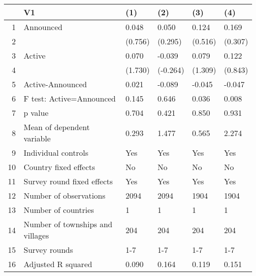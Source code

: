 \begin{table}[ht]
\centering
\begin{tabular}{rlllll}
  \hline
 & V1 & (1) & (2) & (3) & (4) \\ 
  \hline
1 & Announced & 0.048 & 0.050 & 0.124 & 0.169 \\ 
  2 &  & (0.756) & (0.295) & (0.516) & (0.307) \\ 
  3 & Active & 0.070 & -0.039 & 0.079 & 0.122 \\ 
  4 &  & (1.730) & (-0.264) & (1.309) & (0.843) \\ 
  5 & Active-Announced & 0.021 & -0.089 & -0.045 & -0.047 \\ 
  6 & F test: Active=Announced & 0.145 & 0.646 & 0.036 & 0.008 \\ 
  7 & p value & 0.704 & 0.421 & 0.850 & 0.931 \\ 
  8 & Mean of dependent variable & 0.293 & 1.477 & 0.565 & 2.274 \\ 
  9 & Individual controls & Yes & Yes & Yes & Yes \\ 
  10 & Country fixed effects & No & No & No & No \\ 
  11 & Survey round fixed effects & Yes & Yes & Yes & Yes \\ 
  12 & Number of observations & 2094 & 2094 & 1904 & 1904 \\ 
  13 & Number of countries & 1 & 1 & 1 & 1 \\ 
  14 & Number of townships and villages & 204 & 204 & 204 & 204 \\ 
  15 & Survey rounds & 1-7 & 1-7 & 1-7 & 1-7 \\ 
  16 & Adjusted R squared & 0.090 & 0.164 & 0.119 & 0.151 \\ 
   \hline
\end{tabular}
\end{table}
